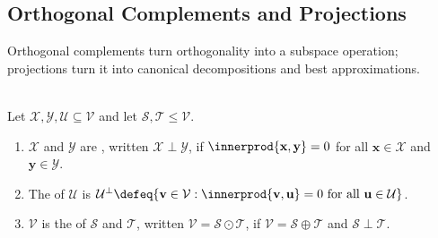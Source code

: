 \subsection{Orthogonal Complements and Projections}

%

Orthogonal complements turn orthogonality into a subspace operation; projections turn it into canonical decompositions and best approximations.

\begin{definition} \label{def:orthogonal-subsets-and-direct-sums}\label{def:orthogonal-complement} \\
Let $\mathcal{X},\mathcal{Y},\mathcal{U}\subseteq\mathcal{V}$ and let $\mathcal{S},\mathcal{T}\leq\mathcal{V}$.
\begin{enumerate}[label=\roman*.]
\setlength{\itemsep}{0pt}
\item $\mathcal{X}$ and $\mathcal{Y}$ are , written $\mathcal{X}\perp\mathcal{Y}$, if $\innerprod{\mathbf{x},\mathbf{y}}=0$ for all $\mathbf{x}\in\mathcal{X}$ and $\mathbf{y}\in\mathcal{Y}$.
\item The  of $\mathcal{U}$ is $\mathcal{U}^{\perp}\defeq\{\mathbf{v}\in\mathcal{V}:\innerprod{\mathbf{v},\mathbf{u}}=0\text{ for all }\mathbf{u}\in\mathcal{U}\}$.
\item $\mathcal{V}$ is the  of $\mathcal{S}$ and $\mathcal{T}$, written $\mathcal{V}=\mathcal{S}\odot\mathcal{T}$, if $\mathcal{V}=\mathcal{S}\oplus\mathcal{T}$ and $\mathcal{S}\perp\mathcal{T}$.
\end{enumerate}
\end{definition}

